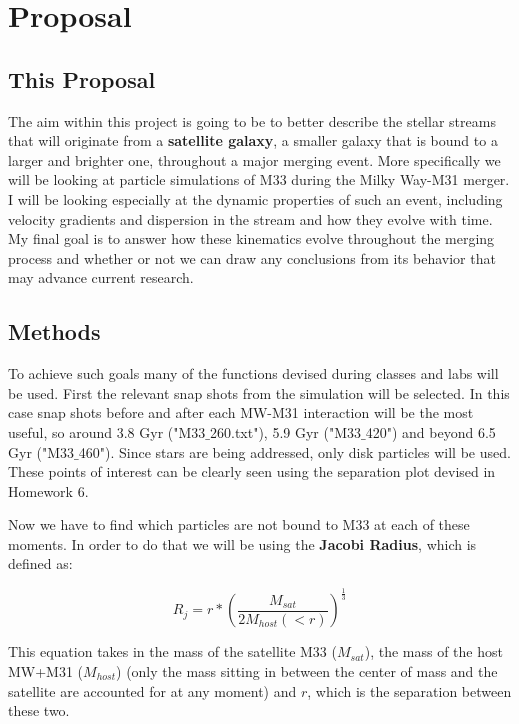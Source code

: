 \documentclass[linenumbers,trackchanges]{aastex7}
\begin{document}
\section{Proposal} \label{sec:style}

\subsection{This Proposal}

The aim within this project is going to be to better describe the stellar streams that will originate from a \textbf{satellite galaxy}, a smaller galaxy that is bound to a larger and brighter one, throughout a major merging event. More specifically we will be looking at particle simulations of M33 during the Milky Way-M31 merger. I will be looking especially at the dynamic properties of such an event, including velocity gradients and dispersion in the stream and how they evolve with time. My final goal is to answer how these kinematics evolve throughout the merging process and whether or not we can draw any conclusions from its behavior that may advance current research. 

\subsection{Methods}

To achieve such goals many of the functions devised during classes and labs will be used. First the relevant snap shots from the simulation will be selected. In this case snap shots before and after each MW-M31 interaction will be the most useful, so around 3.8 Gyr ("M33$\_$260.txt"), 5.9 Gyr ({"M33$\_$420"}) and beyond 6.5 Gyr ("M33$\_$460"). Since stars are being addressed, only disk particles will be used. These points of interest can be clearly seen using the separation plot devised in Homework 6.


Now we have to find which particles are not bound to M33 at each of these moments. In order to do that we will be using the \textbf{Jacobi Radius}, which is defined as:

\begin{equation}
    R_j = r*{(\frac{M_{sat}}{2M_{host}(<r)})}^{\frac{1}{3}}
\end{equation}

This equation takes in the mass of the satellite M33 ($M_{sat}$), the mass of the host MW+M31 ($M_{host}$) (only the mass sitting in between the center of mass and the satellite are accounted for at any moment) and $r$, which is the separation between these two.
\end{document}
